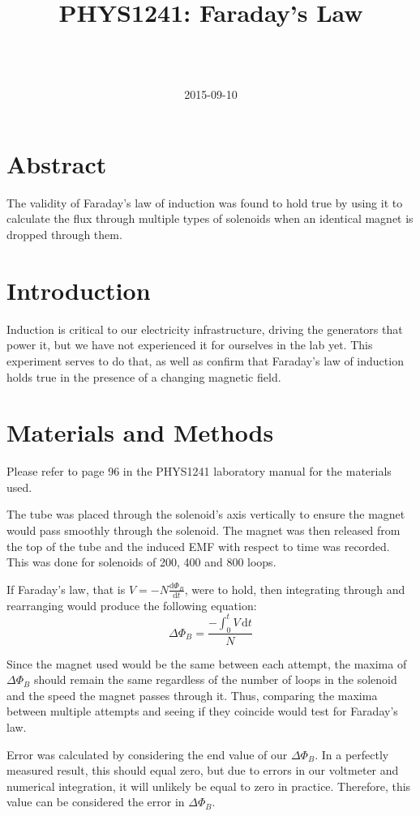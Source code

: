 \documentclass[a4paper]{scrartcl}
\begin{document}
\title{PHYS1241: Faraday's Law}
\author{ \\ \\ }
\date{2015-09-10}
\maketitle

\section{Abstract}
The validity of Faraday's law of induction was found to hold true by using it to calculate the flux through multiple types of solenoids when an identical magnet is dropped through them.

\section{Introduction}
Induction is critical to our electricity infrastructure, driving the generators that power it, but we have not experienced it for ourselves in the lab yet. This experiment serves to do that, as well as confirm that Faraday's law of induction holds true in the presence of a changing magnetic field.

\section{Materials and Methods}
Please refer to page 96 in the PHYS1241 laboratory manual for the materials used.

The tube was placed through the solenoid's axis vertically to ensure the magnet would pass smoothly through the solenoid. The magnet was then released from the top of the tube and the induced EMF with respect to time was recorded. This was done for solenoids of 200, 400 and 800 loops.

If Faraday's law, that is \(V = -N \frac{\mathrm{d}\Phi_B}{\mathrm{d}t}\), were to hold, then integrating through and rearranging would produce the following equation:
\[\Delta\Phi_B = \frac{-\int_0^t V \,\mathrm{d}t}{N}\]

Since the magnet used would be the same between each attempt, the maxima of \(\Delta\Phi_B\) should remain the same regardless of the number of loops in the solenoid and the speed the magnet passes through it. Thus, comparing the maxima between multiple attempts and seeing if they coincide would test for Faraday's law.

Error was calculated by considering the end value of our \(\Delta\Phi_B\). In a perfectly measured result, this should equal zero, but due to errors in our voltmeter and numerical integration, it will unlikely be equal to zero in practice. Therefore, this value can be considered the error in \(\Delta\Phi_B\).
\end{document}

